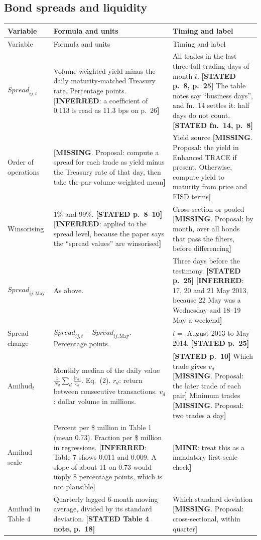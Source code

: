 \documentclass[10pt,a4paper]{article}
\newcommand{\ST}[1]{\textcolor{cst}{\textbf{[STATED #1]}}}
\newcommand{\IN}[1]{\textcolor{cin}{\textbf{[INFERRED}: #1\textbf{]}}}
\newcommand{\MI}[1]{\textcolor{cmi}{\textbf{[MISSING}. Proposal: #1\textbf{]}}}
\newcommand{\MY}[1]{\textcolor{cmy}{\textbf{[MINE}: #1\textbf{]}}}
\newcommand{\Spread}{\mathit{Spread}}
\begin{document}
\subsection{Bond spreads and liquidity}
\begin{longtable}{@{}P{2.7cm}P{7.2cm}P{7.1cm}@{}}
\toprule
Variable & Formula and units & Timing and label\\
\midrule\endfirsthead
\toprule Variable & Formula and units & Timing and label\\ \midrule\endhead
$\Spread_{ij,t}$ & Volume-weighted yield minus the daily maturity-matched Treasury rate. Percentage points. \IN{a coefficient of 0.113 is read as 11.3 bps on p.~26} & All trades in the last three full trading days of month $t$. \ST{p.~8, p.~25} The table notes say ``business days'', and fn.~14 settles it: half days do not count. \ST{fn.~14, p.~8}\\
Order of operations & \MI{compute a spread for each trade as yield minus the Treasury rate of that day, then take the par-volume-weighted mean} & Yield source \MI{the yield in Enhanced TRACE if present. Otherwise, compute yield to maturity from price and FISD terms}\\
Winsorising & 1\% and 99\%. \ST{p.~8--10} \IN{applied to the spread level, because the paper says the ``spread values'' are winsorised} & Cross-section or pooled \MI{by month, over all bonds that pass the filters, before differencing}\\
$\Spread_{ij,\text{May}}$ & As above. & Three days before the testimony. \ST{p.~25} \IN{17, 20 and 21 May 2013, because 22 May was a Wednesday and 18--19 May a weekend}\\
Spread change & $\Spread_{ij,t}-\Spread_{ij,\text{May}}$. Percentage points. & $t=$ August 2013 to May 2014. \ST{p.~25}\\
$\text{Amihud}_{t}$ & Monthly median of the daily value $\frac{1}{N_d}\sum_{d}\frac{|r_d|}{v_d}$. Eq.~(2). $r_d$: return between consecutive transactions. $v_d$: dollar volume in millions. & \ST{p.~10} Which trade gives $v_d$ \MI{the later trade of each pair} Minimum trades \MI{two trades a day}\\
Amihud scale & Percent per \$ million in Table 1 (mean 0.73). Fraction per \$ million in regressions. \IN{Table 7 shows 0.011 and 0.009. A slope of about 11 on 0.73 would imply 8 percentage points, which is not plausible} & \MY{treat this as a mandatory first scale check}\\
Amihud in Table 4 & Quarterly lagged 6-month moving average, divided by its standard deviation. \ST{Table 4 note, p.~18} & Which standard deviation \MI{cross-sectional, within quarter}\\

\end{longtable}
\end{document}
